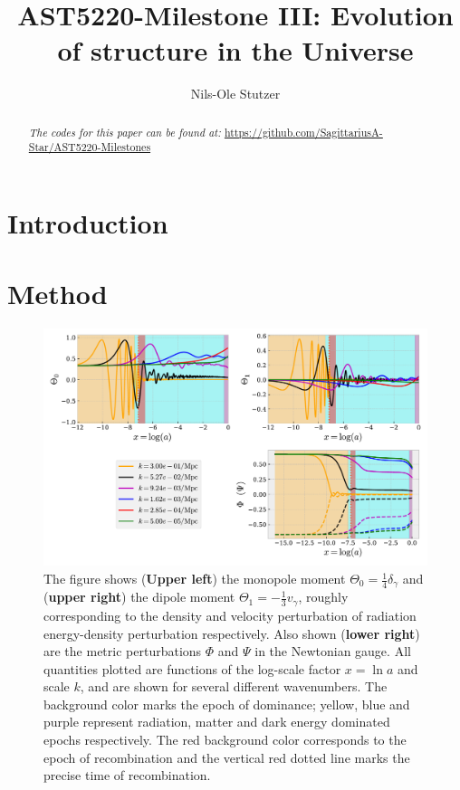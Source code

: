 \documentclass[twocolumn]{aastex62}
\begin{document}
\title{\Large AST5220-Milestone III: Evolution of structure in the Universe}

\author{Nils-Ole Stutzer}

\begin{abstract}
    
    \textit{The codes for this paper can be found at:} \newline \url{https://github.com/SagittariusA-Star/AST5220-Milestones}
\end{abstract}

\section{Introduction} \label{sec:Intro}

\section{Method} \label{sec:Method}

\begin{figure}
    \includegraphics[scale = 0.65]{Figures/fig1.pdf}
    \caption{The figure shows (\textbf{Upper left}) the monopole moment $\Theta_0 = \frac{1}{4}\delta_\gamma$ and (\textbf{upper right}) the dipole moment $\Theta_1 = -\frac{1}{3}v_\gamma$, roughly corresponding to the density and velocity perturbation of radiation energy-density perturbation respectively. Also shown (\textbf{lower right}) are the metric perturbations $\Phi$ and $\Psi$ in the Newtonian gauge. All quantities plotted are functions of the log-scale factor $x = \ln a$ and scale $k$, and are shown for several different wavenumbers. The background color marks the epoch of dominance; yellow, blue and purple represent radiation, matter and dark energy dominated epochs respectively. The red background color corresponds to the epoch of recombination and the vertical red dotted line marks the precise time of recombination.} 
    \label{fig:fig1}
\end{figure}
\end{document}
